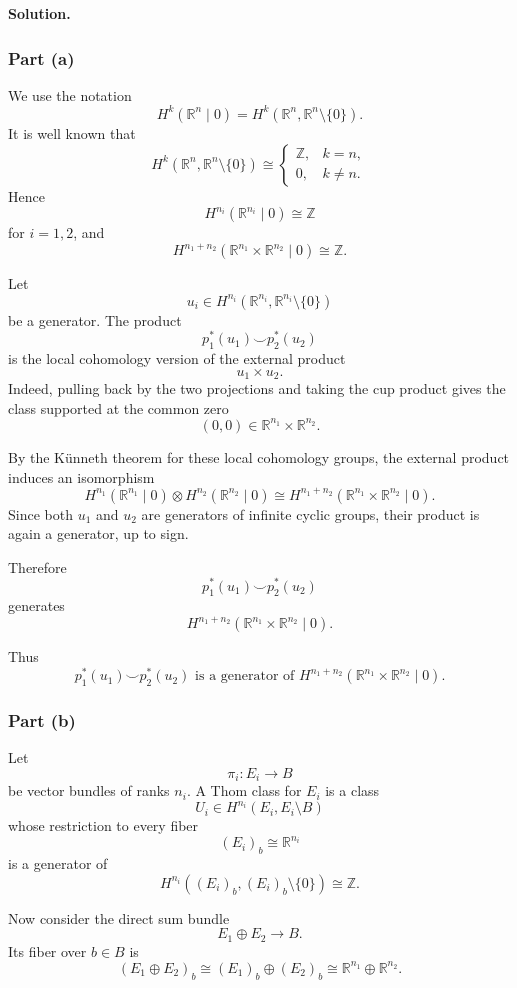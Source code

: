 \documentclass[12pt,a4paper]{article}
\theoremstyle{notespace}
\begin{document}
\noindent\textbf{Solution.}

\subsubsection*{Part (a)}

We use the notation
\[
H^k(\mathbb R^n\mid 0)
=
H^k(\mathbb R^n,\mathbb R^n\setminus\{0\}).
\]
It is well known that
\[
H^k(\mathbb R^n,\mathbb R^n\setminus\{0\})
\cong
\begin{cases}
	\mathbb Z, & k=n,\\
	0, & k\neq n.
\end{cases}
\]
Hence
\[
H^{n_i}(\mathbb R^{n_i}\mid 0)\cong \mathbb Z
\]
for \(i=1,2\), and
\[
H^{n_1+n_2}(\mathbb R^{n_1}\times \mathbb R^{n_2}\mid 0)\cong \mathbb Z.
\]

Let
\[
u_i\in H^{n_i}(\mathbb R^{n_i},\mathbb R^{n_i}\setminus\{0\})
\]
be a generator. The product
\[
p_1^*(u_1)\smile p_2^*(u_2)
\]
is the local cohomology version of the external product
\[
u_1\times u_2.
\]
Indeed, pulling back by the two projections and taking the cup product gives the
class supported at the common zero
\[
(0,0)\in \mathbb R^{n_1}\times \mathbb R^{n_2}.
\]

By the K\"unneth theorem for these local cohomology groups, the external product
induces an isomorphism
\[
H^{n_1}(\mathbb R^{n_1}\mid 0)
\otimes
H^{n_2}(\mathbb R^{n_2}\mid 0)
\cong
H^{n_1+n_2}(\mathbb R^{n_1}\times \mathbb R^{n_2}\mid 0).
\]
Since both \(u_1\) and \(u_2\) are generators of infinite cyclic groups, their
product is again a generator, up to sign.

Therefore
\[
p_1^*(u_1)\smile p_2^*(u_2)
\]
generates
\[
H^{n_1+n_2}(\mathbb R^{n_1}\times \mathbb R^{n_2}\mid 0).
\]

Thus
\[
\boxed{
	p_1^*(u_1)\smile p_2^*(u_2)
	\text{ is a generator of }
	H^{n_1+n_2}(\mathbb R^{n_1}\times \mathbb R^{n_2}\mid 0).
}
\]

\subsubsection*{Part (b)}

Let
\[
\pi_i:E_i\to B
\]
be vector bundles of ranks \(n_i\). A Thom class for \(E_i\) is a class
\[
U_i\in H^{n_i}(E_i,E_i\setminus B)
\]
whose restriction to every fiber
\[
(E_i)_b\cong \mathbb R^{n_i}
\]
is a generator of
\[
H^{n_i}((E_i)_b,(E_i)_b\setminus\{0\})
\cong \mathbb Z.
\]

Now consider the direct sum bundle
\[
E_1\oplus E_2\to B.
\]
Its fiber over \(b\in B\) is
\[
(E_1\oplus E_2)_b
\cong
(E_1)_b\oplus (E_2)_b
\cong
\mathbb R^{n_1}\oplus \mathbb R^{n_2}.
\]
\end{document}
